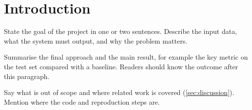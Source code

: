 \section{Introduction}
\label{sec:intro}

State the goal of the project in one or two sentences. Describe the input
data, what the system must output, and why the problem matters.

Summarise the final approach and the main result, for example the key metric
on the test set compared with a baseline. Readers should know the outcome
after this paragraph.

Say what is out of scope and where related work is covered
(\cref{sec:discussion}). Mention where the code and reproduction steps are.

